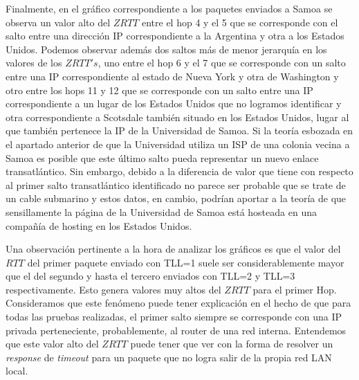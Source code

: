 
Finalmente, en el gráfico correspondiente a los paquetes enviados a Samoa se observa un valor alto del $ZRTT$ entre el hop 4 y el 5 que se corresponde con el salto entre una dirección IP correspondiente a la Argentina y otra a los Estados Unidos. Podemos observar además dos saltos más de menor jerarquía en los valores de los $ZRTT's$, uno entre el hop 6 y el 7 que se corresponde con un salto entre una IP correspondiente al estado de Nueva York y otra de Washington y otro entre los hops 11 y 12 que se corresponde con un salto entre una IP correspondiente a un lugar de los Estados Unidos que no logramos identificar y otra correspondiente a Scotsdale también situado en los Estados Unidos, lugar al que también pertenece la IP de la Universidad de Samoa. Si la teoría esbozada en el apartado anterior de que la Universidad utiliza un ISP de una colonia vecina a Samoa es posible que este último salto pueda representar un nuevo enlace transatlántico. Sin embargo, debido a la diferencia de valor que tiene con respecto al primer salto transatlántico identificado no parece ser probable que se trate de un cable submarino y estos datos, en cambio, podrían aportar a la teoría de que sensillamente la página de la Universidad de Samoa está hosteada en una compañía de hosting en los Estados Unidos.




Una observación pertinente a la hora de analizar los gráficos es que el valor del $RTT$ del primer paquete enviado con TLL=1 suele ser considerablemente mayor que el del segundo y hasta el tercero enviados con TLL=2 y TLL=3 respectivamente. Esto genera valores muy altos del $ZRTT$ para el primer Hop. Consideramos que este fenómeno puede tener explicación en el hecho de que para todas las pruebas realizadas, el primer salto siempre se corresponde con una IP privada perteneciente, probablemente, al router de una red interna. Entendemos que este valor alto del $ZRTT$ puede tener que ver con la forma de resolver un \textit{response} de \textit{timeout} para un paquete que no logra salir de la propia red LAN local.

